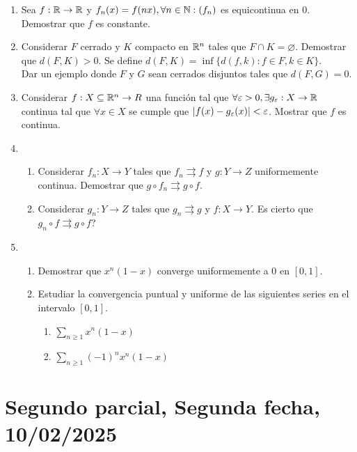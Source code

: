 \begin{enumerate}
  \item Sea \(f : \mathbb{R} \to \mathbb{R} \) y \(f_n(x) = f(nx), \forall n \in \mathbb{N} : (f_n)\) es equicontinua en \(0\). Demostrar que \(f\) es constante.
  \item Considerar \(F\) cerrado y \(K\) compacto en \(\mathbb{R}^n\) tales que \(F \cap K = \varnothing \). Demostrar que \(d(F, K) > 0\). Se define \(d(F, K) = \inf\{ d(f, k) : f \in F, k \in K \} \). \\ Dar un ejemplo donde \(F\) y \(G\) sean cerrados disjuntos tales que \(d(F, G) = 0\).
  \item Considerar \(f: X \subseteq \mathbb{R}^n \to R\) una función tal que \(\forall \varepsilon > 0, \exists g_{\varepsilon}: X \to \mathbb{R} \) continua tal que \(\forall x \in X\) se cumple que \(|f(x) - g_{\varepsilon}(x)| < \varepsilon \). Mostrar que \(f\) es continua.
  \item \begin{enumerate}
          \item Considerar \(f_n: X \to Y\) tales que \(f_n \rightrightarrows f\) y \(g: Y \to Z\) uniformemente continua. Demostrar que \(g \circ f_n \rightrightarrows g \circ f\).
          \item Considerar \(g_n : Y \to Z\) tales que \(g_n \rightrightarrows g\) y \(f: X \to Y\). Es cierto que \(g_n \circ f \rightrightarrows g \circ f\)?
        \end{enumerate}
  \item \begin{enumerate}
          \item Demostrar que \(x^n(1-x)\) converge uniformemente a \(0\) en \([0, 1]\).
          \item Estudiar la convergencia puntual y uniforme de las siguientes series en el intervalo \([0, 1]\). \begin{enumerate} \item \(\sum_{n \geq 1} x^n(1-x)\) \item \(\sum_{n \geq 1} (-1)^n x^n(1-x)\) \end{enumerate}
        \end{enumerate}
\end{enumerate}

\clearpage

\section{Segundo parcial, Segunda fecha, 10/02/2025}

